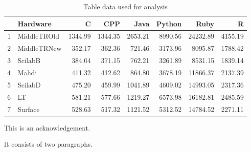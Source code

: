 \documentclass[12pt,halfline,a4paper,]{ouparticle}
\begin{document}
\begin{table}[ht]
\centering
\begin{tabular}{rlrrrrrr}
  \hline
 & Hardware & C & CPP & Java & Python & Ruby & R \\ 
  \hline
1 & MiddleTROld & 1344.99 & 1344.35 & 2653.21 & 8990.56 & 24232.89 & 4155.19 \\ 
  2 & MiddleTRNew & 352.17 & 362.36 & 721.46 & 3173.96 & 8095.87 & 1788.42 \\ 
  3 & ScilabB & 384.04 & 371.15 & 762.21 & 3261.89 & 8531.15 & 1839.14 \\ 
  4 & Mahdi & 411.32 & 412.62 & 864.80 & 3678.19 & 11866.37 & 2137.39 \\ 
  5 & ScilabD & 475.20 & 459.99 & 1041.89 & 4609.02 & 14993.05 & 2317.36 \\ 
  6 & LT & 581.21 & 577.66 & 1219.27 & 6573.98 & 16182.81 & 2485.59 \\ 
  7 & Surface & 528.63 & 517.32 & 1121.52 & 5312.52 & 14784.52 & 2271.11 \\ 
   \hline
\end{tabular}
\caption{Table data used for analysis} 
\end{table}


\begin{notes}[Acknowledgements]
This is an acknowledgement.

It consists of two paragraphs.
\end{notes}
\end{document}
